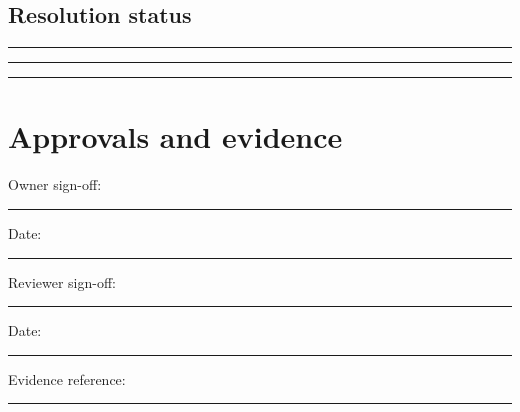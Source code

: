 \documentclass[11pt]{article}
\begin{document}
\subsection{Resolution status}
\noindent\rule{\linewidth}{0.3pt}\par\vspace{0.18in}
\noindent\rule{\linewidth}{0.3pt}\par\vspace{0.18in}
\noindent\rule{\linewidth}{0.3pt}\par\vspace{0.14in}

\section{Approvals and evidence}
\noindent Owner sign-off: \rule{0.42\linewidth}{0.4pt}\hfill Date: \rule{0.19\linewidth}{0.4pt}\par\vspace{0.4cm}
\noindent Reviewer sign-off: \rule{0.40\linewidth}{0.4pt}\hfill Date: \rule{0.19\linewidth}{0.4pt}\par\vspace{0.4cm}
\noindent Evidence reference: \rule{0.70\linewidth}{0.4pt}
\end{document}
